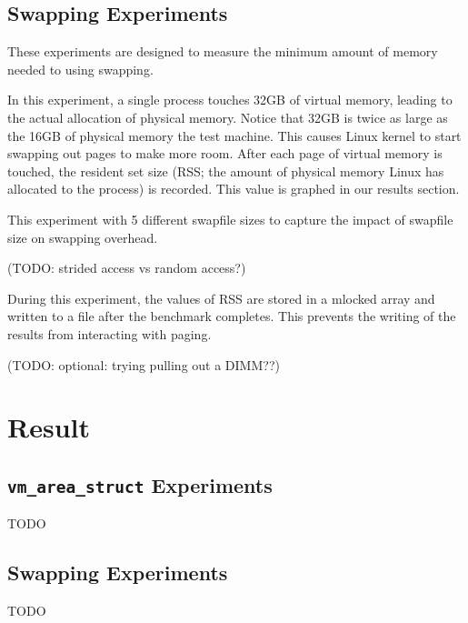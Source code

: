 \documentclass[twocolumn,11pt]{article}
\begin{document}
\subsection{Swapping Experiments}

These experiments are designed to measure the minimum amount of memory needed
to using swapping.

In this experiment, a single process touches 32GB of virtual memory, leading to
the actual allocation of physical memory. Notice that 32GB is twice as large as
the 16GB of physical memory the test machine. This causes Linux kernel to start
swapping out pages to make more room.  After each page of virtual memory is
touched, the resident set size (RSS; the amount of physical memory Linux has
allocated to the process) is recorded. This value is graphed in our results
section.

This experiment with 5 different swapfile sizes to capture the impact
of swapfile size on swapping overhead.

(TODO: strided access vs random access?)

During this experiment, the values of RSS are stored in a mlocked array and
written to a file after the benchmark completes. This prevents the writing of
the results from interacting with paging.

(TODO: optional: trying pulling out a DIMM??)

\section{Result}

\subsection{\texttt{vm\_area\_struct} Experiments}

TODO

\subsection{Swapping Experiments}

TODO

{}

\end{document}
